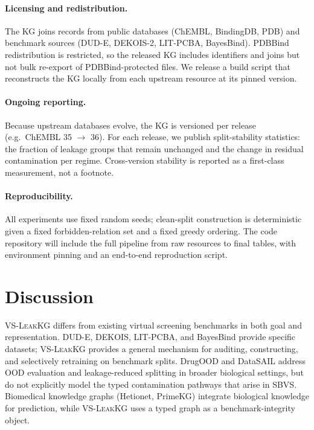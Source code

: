 \documentclass[11pt]{article}
\begin{document}
\paragraph{Licensing and redistribution.}
The KG joins records from public databases (ChEMBL, BindingDB, PDB) and benchmark sources (DUD-E, DEKOIS-2, LIT-PCBA, BayesBind). PDBBind redistribution is restricted, so the released KG includes identifiers and joins but not bulk re-export of PDBBind-protected files. We release a build script that reconstructs the KG locally from each upstream resource at its pinned version.

\paragraph{Ongoing reporting.}
Because upstream databases evolve, the KG is versioned per release (e.g.\ ChEMBL 35 \(\to\) 36). For each release, we publish split-stability statistics: the fraction of leakage groups that remain unchanged and the change in residual contamination per regime. Cross-version stability is reported as a first-class measurement, not a footnote.

\paragraph{Reproducibility.}
All experiments use fixed random seeds; clean-split construction is deterministic given a fixed forbidden-relation set and a fixed greedy ordering. The code repository will include the full pipeline from raw resources to final tables, with environment pinning and an end-to-end reproduction script.

\section{Discussion}

\textsc{VS-LeakKG} differs from existing virtual screening benchmarks in both goal and representation. DUD-E, DEKOIS, LIT-PCBA, and BayesBind provide specific datasets; \textsc{VS-LeakKG} provides a general mechanism for auditing, constructing, and selectively retraining on benchmark splits. DrugOOD and DataSAIL address OOD evaluation and leakage-reduced splitting in broader biological settings, but do not explicitly model the typed contamination pathways that arise in SBVS. Biomedical knowledge graphs (Hetionet, PrimeKG) integrate biological knowledge for prediction, while \textsc{VS-LeakKG} uses a typed graph as a benchmark-integrity object.
\end{document}
